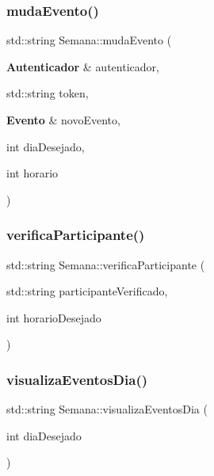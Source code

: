 \subsubsection{muda\+Evento()}
{\footnotesize\ttfamily std\+::string Semana\+::muda\+Evento (\begin{DoxyParamCaption}\item[{\textbf{ Autenticador} \&}]{autenticador,  }\item[{std\+::string}]{token,  }\item[{\textbf{ Evento} \&}]{novo\+Evento,  }\item[{int}]{dia\+Desejado,  }\item[{int}]{horario }\end{DoxyParamCaption})\hspace{0.3cm}{\ttfamily [inline]}}

\mbox{\label{class_semana_ae6fd382ff5ce245fd68d244d775ec377}} 
\subsubsection{verifica\+Participante()}
{\footnotesize\ttfamily std\+::string Semana\+::verifica\+Participante (\begin{DoxyParamCaption}\item[{std\+::string}]{participante\+Verificado,  }\item[{int}]{horario\+Desejado }\end{DoxyParamCaption})\hspace{0.3cm}{\ttfamily [inline]}}

\mbox{\label{class_semana_a2203942f09475162e8cc882c4088170a}} 
\subsubsection{visualiza\+Eventos\+Dia()}
{\footnotesize\ttfamily std\+::string Semana\+::visualiza\+Eventos\+Dia (\begin{DoxyParamCaption}\item[{int}]{dia\+Desejado }\end{DoxyParamCaption})\hspace{0.3cm}{\ttfamily [inline]}}

\mbox{\label{class_semana_a4deb2dc70a907ae674c72678976feafa}} 
